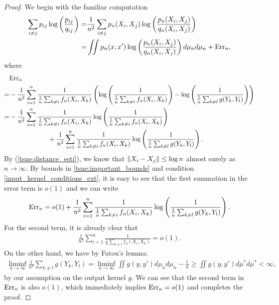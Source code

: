 \begin{proof}
    We begin with the familiar computation
    \begin{align}
        \sum_{i \neq j} p_{ij} \log \left(\frac{p_{ij}}{q_{ij}}\right) = & \frac{1}{n^2}\sum_{i \neq j}p_n(X_i,X_j) \log \left(\frac{p_n(X_i,X_j)}{q_n(X_i,X_j)}\right) \nonumber          \\
        =                                                                & \iint p_n(x,x') \log \left(\frac{p_n(X_i,X_j)}{q_n(X_i,X_j)}\right) d \mu_n d \mu_n + \text{\normalfont Err}_n,
    \end{align}
    where
    \begin{align}
          & \text{\normalfont Err}_n \nonumber                                                                                                                                                                                                   \\
        = & -\frac{1}{n^2}\sum_{i=1}^n\frac{1}{\frac{1}{n}\sum_{k \neq i}f_n(X_i,X_k)}\left(\log \left(\frac{1}{\frac{1}{n}\sum_{k \neq i}f_n(X_i,X_k)}\right)-\log \left(\frac{1}{\frac{1}{n}\sum_{k \neq l}g(Y_k,Y_l)}\right)\right) \nonumber \\
        = & -\frac{1}{n^2}\sum_{i=1}^n\frac{1}{\frac{1}{n}\sum_{k \neq i}f_n(X_i,X_k)}\log \left(\frac{1}{\frac{1}{n}\sum_{k \neq i}f_n(X_i,X_k)}\right) \nonumber                                                                               \\
          & \qquad \qquad \qquad + \frac{1}{n^2}\sum_{i=1}^n\frac{1}{\frac{1}{n}\sum_{k \neq i}f_n(X_i,X_k)}\log \left(\frac{1}{\frac{1}{n}\sum_{k \neq l}g(Y_k,Y_l)}\right).
    \end{align}
    By (\ref{tsne:distance_esti}), we know that $\left\lVert X_i - X_j\right\rVert \leq \log n$ almost surely as $n \to \infty$. By bounds in \eqref{tsne:important_bounds} and condition \ref{input_kernel_conditions_ext}, it is easy to see that the first summation in the error term is $o(1)$ and we can write
    \begin{align}
        \text{\normalfont Err}_n = o(1) + \frac{1}{n^2}\sum_{i=1}^n\frac{1}{\frac{1}{n}\sum_{k \neq i}f_n(X_i,X_k)}\log \left(\frac{1}{\frac{1}{n}\sum_{k \neq l}g(Y_k,Y_l)}\right).
    \end{align}
    For the second term, it is already clear that
    \begin{align}
        \frac{1}{n^2}\sum_{i=1}^n\frac{1}{\frac{1}{n}\sum_{k \neq i}f_n(X_i,X_k)} = o(1).
    \end{align}
    On the other hand, we have by Fatou's lemma:
    \begin{align}
        \liminf_{n \to \infty}\frac{1}{n^2} \sum_{k \neq l}g(Y_k,Y_l) = \liminf_{n \to \infty} \iint g(y,y') d\mu_n d\mu_n - \frac{1}{n} \geq \iint g(y,y') d\mu^* d\mu^* < \infty,
    \end{align}
    by our assumption on the output kernel $g$. We can see that the second term in $\text{\normalfont Err}_n$ is also $o(1)$, which immediately implies $\text{\normalfont Err}_n = o(1)$ and completes the proof.
\end{proof}
